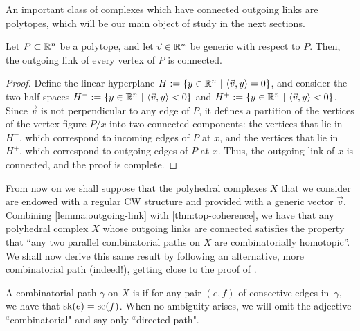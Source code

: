 An important class of complexes which have connected outgoing links are polytopes, which will be our main object of study in the next sections.

\begin{proposition}
\label{prop:polytopes}
    Let $P \subset \mathbb R^n$ be a polytope, and let $\vec v \in \mathbb R^n$ be generic with respect to $P$. 
    Then, the outgoing link of every vertex of $P$ is connected.
\end{proposition}

\begin{proof}
    Define the linear hyperplane $H:=\{y \in \mathbb R^n \ | \ \langle \vec v, y \rangle = 0\}$, and consider the two half-spaces $H^{-}:=\{y \in \mathbb R^n \ | \ \langle \vec v, y \rangle < 0\}$ and $H^{+}:=\{y \in \mathbb R^n \ | \ \langle \vec v, y \rangle < 0\}$.
    Since $\vec v$ is not perpendicular to any edge of $P$, it defines a partition of the vertices of the vertex figure $P/x$ into two connected components: the vertices that lie in $H^{-}$, which correspond to incoming edges of $P$ at $x$, and the vertices that lie in $H^{+}$, which correspond to outgoing edges of $P$ at $x$.
    Thus, the outgoing link of $x$ is connected, and the proof is complete.
\end{proof}

From now on we shall suppose that the polyhedral complexes $X$ that we consider are endowed with a regular CW structure and provided with a generic vector $\vec v$.
Combining \cref{lemma:outgoing-link} with \cref{thm:top-coherence}, we have that any polyhedral complex $X$ whose outgoing links are connected satisfies the property that ``any two parallel combinatorial paths on $X$ are combinatorially homotopic''.
We shall now derive this same result by following an alternative, more combinatorial path (indeed!), getting close to the proof of \cite[Thm~3.1]{MacLane63}.

A combinatorial path $\gamma$ on $X$ is  if for any pair $(e, f)$ of consective edges in~$\gamma$, we have that $\mathrm{sk}(e)=\mathrm{sc}(f)$.  
When no ambiguity arises, we will omit the adjective ``combinatorial" and say only ``directed path".

